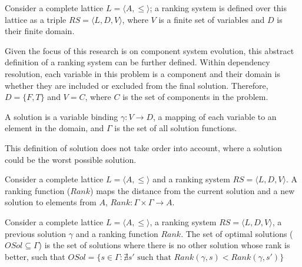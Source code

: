 \begin{defs}
Consider a complete lattice $L = \langle A, \leq \rangle$; 
a ranking system is defined over this lattice as a triple $RS = \langle L, D, V \rangle$, 
where $V$ is a finite set of variables and $D$ is their finite domain.
\end{defs}

Given the focus of this research is on component system evolution,
this abstract definition of a ranking system can be further defined.
Within dependency resolution, 
each variable in this problem is a component and their domain is whether they are included or excluded from the final solution.
Therefore, $D = \{F,T\}$ and $V = C$, where $C$ is the set of components in the problem.

\begin{defs}
A solution is a variable binding $\gamma: V \rightarrow D$, a mapping of each variable to an element in the domain,
and $\Gamma$ is the set of all solution functions.
\end{defs}

This definition of solution does not take order into account, where a solution could be the worst possible solution.

\begin{defs}
Consider a complete lattice $L = \langle A, \leq \rangle$ and a ranking system $RS = \langle L, D, V \rangle$.
A ranking function ($Rank$) maps the distance from the current solution and a new solution to elements from $A$,
$Rank: \Gamma \times \Gamma \rightarrow A$.
\end{defs}

\begin{defs}
Consider a complete lattice $L = \langle A, \leq \rangle$, a ranking system $RS = \langle L, D, V \rangle$, a previous solution $\gamma$ and a ranking function $Rank$.
The set of optimal solutions ($OSol \subseteq \Gamma$) is the set of solutions where there is no other solution whose rank is better,
such that $OSol = \{ s \in \Gamma : \nexists s' \mbox{ such that } Rank(\gamma,s) < Rank(\gamma,s')\}$
\end{defs}


